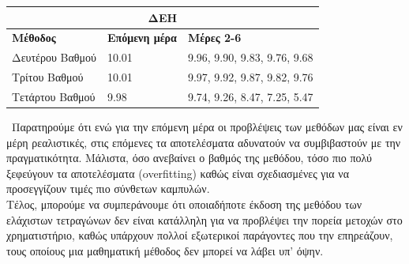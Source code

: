 \documentclass{article}
\begin{document}
\begin{center}
\begin{table}[H]
\begin{tabular}{|l|l|l|}
\hline
\multicolumn{3}{|c|}{\textbf{ΔΕΗ}} \\
\hline
\textbf{Μέθοδος} & \textbf{Επόμενη μέρα} & \textbf{Μέρες 2-6} \\
\hline
Δευτέρου Βαθμού & 10.01 & 9.96, 9.90, 9.83, 9.76, 9.68 \\
\hline
Τρίτου Βαθμού & 10.01 & 9.97, 9.92, 9.87, 9.82, 9.76 \\
\hline
Τετάρτου Βαθμού & 9.98 & 9.74, 9.26, 8.47, 7.25, 5.47 \\
\hline
\end{tabular}
\label{table:deh_stock_closings}
\end{table}    
\end{center}\
Παρατηρούμε ότι ενώ για την επόμενη μέρα οι προβλέψεις των μεθόδων μας είναι εν μέρη ρεαλιστικές, στις επόμενες τα αποτελέσματα αδυνατούν να συμβιβαστούν με την πραγματικότητα. Μάλιστα, όσο ανεβαίνει ο βαθμός της μεθόδου, τόσο πιο πολύ ξεφεύγουν τα αποτελέσματα (overfitting) καθώς είναι σχεδιασμένες για να προσεγγίζουν τιμές πιο σύνθετων καμπυλών.\\
Τέλος, μπορούμε να συμπεράνουμε ότι οποιαδήποτε έκδοση της μεθόδου των ελάχιστων τετραγώνων δεν είναι κατάλληλη για να προβλέψει την πορεία μετοχών στο χρηματιστήριο, καθώς υπάρχουν πολλοί εξωτερικοί παράγοντες που την επηρεάζουν, τους οποίους μια μαθηματική μέθοδος δεν μπορεί να λάβει υπ' όψην.
\end{document}
